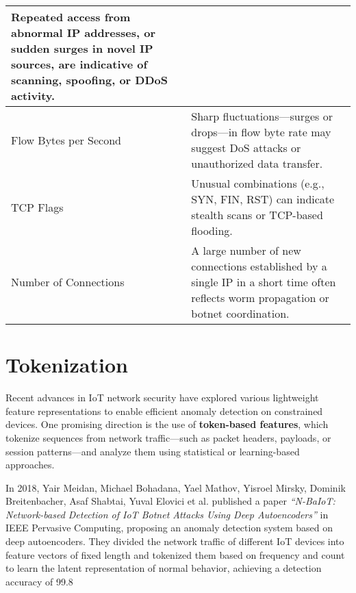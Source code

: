 \begin{ZhChapter}
\begin{table*}[htbp]
{{\begin{tabular}{| l | p{10cm} |}
                    Repeated access from abnormal IP addresses, or sudden surges in novel IP sources, are indicative of scanning, spoofing, or DDoS activity. \\
                    \hline
                    Flow Bytes per Second\cite{tang2016deep}                &
                    Sharp fluctuations—surges or drops—in flow byte rate may suggest DoS attacks or unauthorized data transfer.                               \\
                    \hline
                    TCP Flags\cite{sharafaldin2018cicflowmeter}             &
                    Unusual combinations (e.g., SYN, FIN, RST) can indicate stealth scans or TCP-based flooding.                                              \\
                    \hline
                    Number of Connections\cite{tang2016deep}                &
                    A large number of new connections established by a single IP in a short time often reflects worm propagation or botnet coordination.      \\
                    \hline
                \end{tabular}
            }
        }
    \end{table*}







    \section{Tokenization}
    \noindent Recent advances in IoT network security have explored various lightweight feature representations to enable efficient anomaly detection on constrained devices. One promising direction is the use of \textbf{token-based features}, which tokenize sequences from network traffic—such as packet headers, payloads, or session patterns—and analyze them using statistical or learning-based approaches.


    \noindent In 2018, Yair Meidan, Michael Bohadana, Yael Mathov, Yisroel Mirsky, Dominik Breitenbacher, Asaf Shabtai, Yuval Elovici et al. published a paper \emph{“N-BaIoT: Network-based Detection of IoT Botnet Attacks Using Deep Autoencoders”} in IEEE Pervasive Computing, proposing an anomaly detection system based on deep autoencoders. They divided the network traffic of different IoT devices into feature vectors of fixed length and tokenized them based on frequency and count to learn the latent representation of normal behavior, achieving a detection accuracy of 99.8%



\end{ZhChapter}
